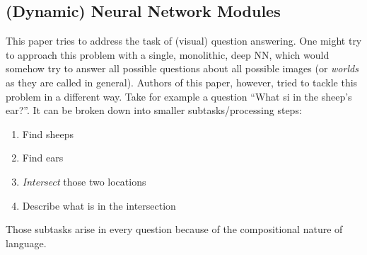 \documentclass[a4paper]{article}
\begin{document}
\begin{multicols}{2}
\section*{(Dynamic) Neural Network Modules}

This paper tries to address the task of (visual) question answering. One might try to approach this problem with a single, monolithic, deep NN, which would somehow try to answer all possible questions about all possible images (or \textit{worlds} as they are called in general). Authors of this paper, however, tried to tackle this problem in a different way. Take for example a question ``What si in the sheep's ear?''. It can be broken down into smaller subtasks/processing steps:
    \begin{enumerate}
        \item Find sheeps
        \item Find ears
        \item \textit{Intersect} those two locations
        \item Describe what is in the intersection
    \end{enumerate}
Those subtasks arise in every question because of the compositional nature of language.


\end{multicols}
\end{document}
